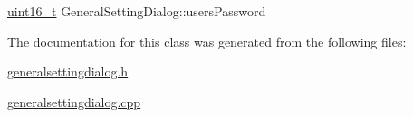 \mbox{\label{classGeneralSettingDialog_a365c466e185f88bad08aeb6ff036c403}} 
{\footnotesize\ttfamily \mbox{\hyperlink{settings_8h_a017dd44e68049ffdd31500a8cd01ba68}{uint16\+\_\+t}} General\+Setting\+Dialog\+::\texorpdfstring{users\+Password}{usersPassword}{\ttfamily [private]}}

The documentation for this class was generated from the following files\+:\begin{DoxyCompactItemize}
\item 
\mbox{\hyperlink{generalsettingdialog_8h}{generalsettingdialog.\+h}}\item 
\mbox{\hyperlink{generalsettingdialog_8cpp}{generalsettingdialog.\+cpp}}\end{DoxyCompactItemize}
\newpage